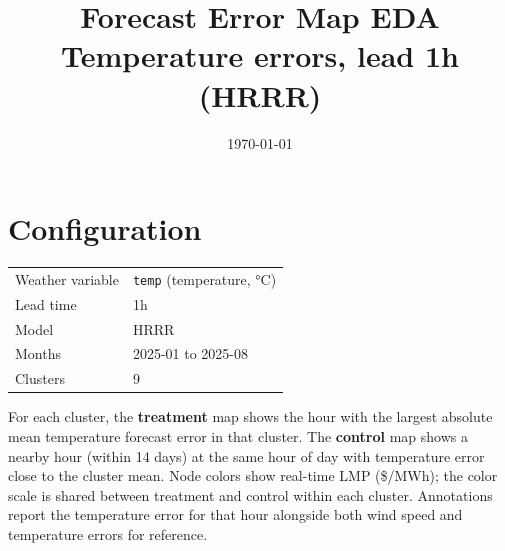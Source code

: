 \documentclass[11pt]{article}
\begin{document}
\title{Forecast Error Map EDA \\[4pt]
\large Temperature errors, lead 1h (HRRR)}
\author{}
\date{\today}
\maketitle

\section*{Configuration}
\begin{tabular}{ll}
\toprule
Weather variable & \texttt{temp} (temperature, °C) \\
Lead time & 1h \\
Model & HRRR \\
Months & 2025-01 to 2025-08 \\
Clusters & 9 \\
\bottomrule
\end{tabular}

\bigskip
For each cluster, the \textbf{treatment} map shows the hour with the
largest absolute mean temperature forecast error in that cluster.
The \textbf{control} map shows a nearby hour (within 14 days)
at the same hour of day with temperature error close to the cluster mean.
Node colors show real-time LMP (\$/MWh); the color scale is shared between
treatment and control within each cluster.
Annotations report the temperature error for that hour alongside both wind
speed and temperature errors for reference.
\end{document}
